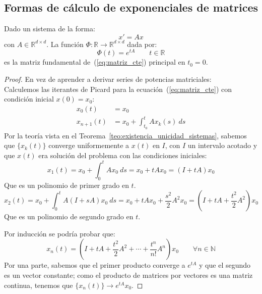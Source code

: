 \subsection{Formas de cálculo de exponenciales de matrices}
\begin{prop}
    Dado un sistema de la forma:
    \begin{equation}\label{eq:matriz_cte}
        x' = Ax
    \end{equation}
    con $A\in \mathbb{R}^{d\times d}$. La función $\Phi:\mathbb{R}\rightarrow\mathbb{R}^{d\times d}$ dada por:
    \begin{equation*}
        \Phi(t) = e^{tA} \qquad t\in \mathbb{R}
    \end{equation*}
    es la matriz fundamental de~(\ref{eq:matriz_cte}) principal en $t_0 = 0$.
    \begin{proof}
        En vez de aprender a derivar series de potencias matriciales:\\
        Calculemos las iterantes de Picard para la ecuación~(\ref{eq:matriz_cte}) con condición inicial $x(0) = x_0$:
        \begin{align*}
            x_0(t) &= x_0 \\
            x_{n+1}(t) &= x_0 + \int_{t_0}^{t} Ax_k(s)~ds 
        \end{align*}
        Por la teoría vista en el Teorema~\ref{teo:existencia_unicidad_sistemas}, sabemos que $\{x_k(t)\}$ converge uniformemente a $x(t)$ en $I$, con $I$ un intervalo acotado y que $x(t)$ era solución del problema con las condiciones iniciales:
        \begin{equation*}
            x_1(t) = x_0 + \int_{0}^{t} Ax_0~ds  = x_0 + tAx_0 = (I+tA)x_0
        \end{equation*}
        Que es un polinomio de primer grado en $t$.
        \begin{equation*}
            x_2(t) = x_0 + \int_{0}^{t} A(I+sA)x_0~ds = x_0 + tAx_0 + \dfrac{s^2}{2}A^2 x_0 = \left(I+tA+\dfrac{t^2}{2}A^2\right)x_0
        \end{equation*}
        Que es un polinomio de segundo grado en $t$.

        Por inducción se podría probar que:
        \begin{equation*}
            x_n(t) = \left(I + tA + \dfrac{t^2}{2}A^2 + \cdots + \dfrac{t^n}{n!}A^n\right) x_0 \qquad \forall n\in \mathbb{N}
        \end{equation*}
        Por una parte, sabemos que el primer producto converge a $e^{tA}$ y que el segundo es un vector constante; como el producto de matrices por vectores es una matriz continua, tenemos que $\{x_n(t)\}\rightarrow e^{tA}x_0$.


\end{proof}
\end{prop}
